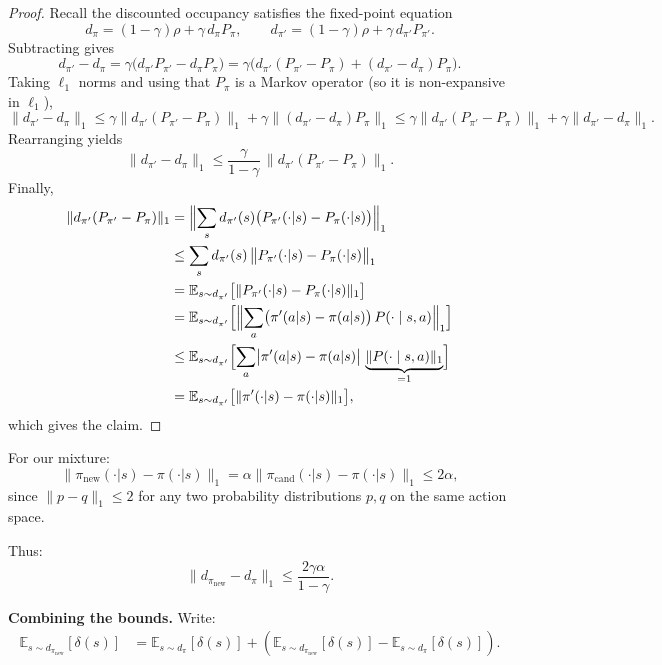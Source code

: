 \documentclass{article}
\theoremstyle{plain}
\theoremstyle{definition}
\theoremstyle{remark}
\newcommand{\E}{\mathbb{E}}
\begin{document}
\begin{proof}
Recall the discounted occupancy satisfies the fixed-point equation
\[
d_\pi = (1-\gamma)\rho + \gamma\, d_\pi P_\pi,
\qquad
d_{\pi'} = (1-\gamma)\rho + \gamma\, d_{\pi'} P_{\pi'}.
\]
Subtracting gives
\[
d_{\pi'}-d_\pi
=
\gamma\bigl(d_{\pi'}P_{\pi'}-d_\pi P_\pi\bigr)
=
\gamma\bigl(d_{\pi'}(P_{\pi'}-P_\pi) + (d_{\pi'}-d_\pi)P_\pi\bigr).
\]
Taking $\ell_1$ norms and using that $P_\pi$ is a Markov operator (so it is non-expansive in $\ell_1$),
\[
\|d_{\pi'}-d_\pi\|_1
\le
\gamma\|d_{\pi'}(P_{\pi'}-P_\pi)\|_1
+\gamma\|(d_{\pi'}-d_\pi)P_\pi\|_1
\le
\gamma\|d_{\pi'}(P_{\pi'}-P_\pi)\|_1
+\gamma\|d_{\pi'}-d_\pi\|_1.
\]
Rearranging yields
\[
\|d_{\pi'}-d_\pi\|_1
\le
\frac{\gamma}{1-\gamma}\,\|d_{\pi'}(P_{\pi'}-P_\pi)\|_1.
\]
Finally,
\begin{align}
\|d_{\pi'}(P_{\pi'}-P_\pi)\|_1
&=
\Bigl\|
\sum_s d_{\pi'}(s)\bigl(P_{\pi'}(\cdot|s)-P_\pi(\cdot|s)\bigr)
\Bigr\|_1
\notag\\
&\le
\sum_s d_{\pi'}(s)\,\bigl\|P_{\pi'}(\cdot|s)-P_\pi(\cdot|s)\bigr\|_1
\notag\\
&=
\E_{s\sim d_{\pi'}}\bigl[\|P_{\pi'}(\cdot|s)-P_\pi(\cdot|s)\|_1\bigr]
\notag\\
&=
\E_{s\sim d_{\pi'}}\Bigl[\Bigl\|\sum_a \bigl(\pi'(a|s)-\pi(a|s)\bigr)\,P(\cdot\mid s,a)\Bigr\|_1\Bigr]
\notag\\
&\le
\E_{s\sim d_{\pi'}}\Bigl[\sum_a \bigl|\pi'(a|s)-\pi(a|s)\bigr|\,\underbrace{\|P(\cdot\mid s,a)\|_1}_{=1}\Bigr]
\notag\\
&=
\E_{s\sim d_{\pi'}}\bigl[\|\pi'(\cdot|s)-\pi(\cdot|s)\|_1\bigr],
\end{align}
which gives the claim.
\end{proof}

For our mixture:
\begin{equation}
\|\pi_{\mathrm{new}}(\cdot|s) - \pi(\cdot|s)\|_1
=
\alpha \|\pi_{\mathrm{cand}}(\cdot|s) - \pi(\cdot|s)\|_1
\le 2\alpha,
\end{equation}
since $\|p-q\|_1\le 2$ for any two probability distributions $p,q$ on the same action space.


Thus:
\begin{equation}
\|d_{\pi_{\mathrm{new}}} - d_\pi\|_1 \le \frac{2\gamma\alpha}{1-\gamma}.
\end{equation}

\textbf{Combining the bounds.}
Write:
\begin{align}
\E_{s \sim d_{\pi_{\mathrm{new}}}}[\delta(s)] &= \E_{s \sim d_\pi}[\delta(s)] + \left(\E_{s \sim d_{\pi_{\mathrm{new}}}}[\delta(s)] - \E_{s \sim d_\pi}[\delta(s)]\right).
\end{align}
\end{document}
